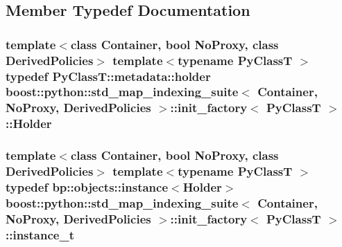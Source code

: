 \subsection{Member Typedef Documentation}
\hypertarget{structboost_1_1python_1_1std__map__indexing__suite_1_1init__factory_a785b4c017210dd048b47eb6c04a5cdc6}{
\subsubsection[{Holder}]{\setlength{\rightskip}{0pt plus 5cm}template$<$class Container, bool No\-Proxy, class Derived\-Policies$>$ template$<$typename Py\-Class\-T $>$ typedef Py\-Class\-T\-::metadata\-::holder {\bf boost\-::python\-::std\-\_\-map\-\_\-indexing\-\_\-suite}$<$ Container, No\-Proxy, Derived\-Policies $>$\-::{\bf init\-\_\-factory}$<$ Py\-Class\-T $>$\-::{\bf Holder}}}\label{structboost_1_1python_1_1std__map__indexing__suite_1_1init__factory_a785b4c017210dd048b47eb6c04a5cdc6}
\hypertarget{structboost_1_1python_1_1std__map__indexing__suite_1_1init__factory_aea2971d45c2f4de6ac83494b504d9a19}{
\subsubsection[{instance\-\_\-t}]{\setlength{\rightskip}{0pt plus 5cm}template$<$class Container, bool No\-Proxy, class Derived\-Policies$>$ template$<$typename Py\-Class\-T $>$ typedef bp\-::objects\-::instance$<${\bf Holder}$>$ {\bf boost\-::python\-::std\-\_\-map\-\_\-indexing\-\_\-suite}$<$ Container, No\-Proxy, Derived\-Policies $>$\-::{\bf init\-\_\-factory}$<$ Py\-Class\-T $>$\-::{\bf instance\-\_\-t}}}\label{structboost_1_1python_1_1std__map__indexing__suite_1_1init__factory_aea2971d45c2f4de6ac83494b504d9a19}



